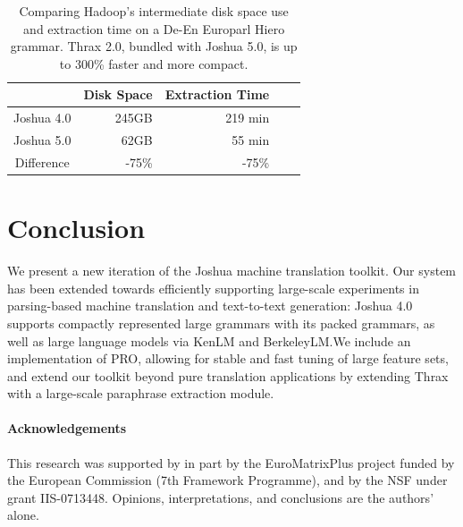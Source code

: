 \documentclass[11pt]{article}
\begin{document}
\begin{table}[t]
  \begin{center}
    \begin{tabular}{|c|r|r|r|r|}
      \hline
    & Disk Space & Extraction Time \\
      \hline
      \hline
      Joshua 4.0 & 245GB & 219 min \\
      \hline
      Joshua 5.0 & 62GB  & 55 min\\
      \hline
      \hline
      Difference & -75\% & -75\% \\
      \hline
    \end{tabular}
  \end{center}
  \caption{Comparing Hadoop's intermediate disk space use and extraction time on a
    De-En Europarl Hiero grammar. Thrax 2.0, bundled with Joshua 5.0,
    is up to 300\% faster and more compact.}
  \label{tab-thrax-speed}
\end{table}




\section{Conclusion}

We present a new iteration of the Joshua machine translation
toolkit. Our system has been extended towards efficiently supporting
large-scale experiments in parsing-based machine translation and
text-to-text generation: Joshua 4.0 supports compactly represented
large grammars with its packed grammars, as well as large language
models via KenLM and BerkeleyLM.We include an implementation of PRO,
allowing for stable and fast tuning of large feature sets, and extend
our toolkit beyond pure translation applications by extending Thrax
with a large-scale paraphrase extraction module.

\paragraph{Acknowledgements}

This research was supported by in part by the EuroMatrixPlus project
funded by the European Commission (7th Framework Programme), and by
the NSF under grant IIS-0713448. Opinions, interpretations, and
conclusions are the authors' alone.



\end{document}

